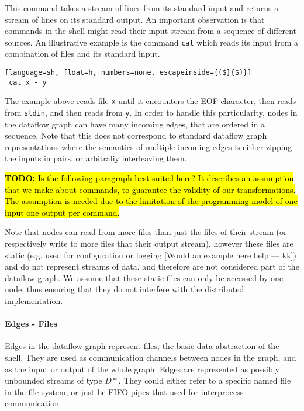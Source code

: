 \documentclass[sigplan,10pt,review,anonymous]{acmart}
\newcommand{\ttt}[1]{\texttt{\small #1}}
\newcommand{\TODO}[1]{\hl{\textbf{TODO:} #1}\xspace}
\newcommand{\kk}[1]{[{\color{magenta}#1 --- kk}]}
\begin{document}
\noindent
This command takes a stream of lines from its standard input and
returns a stream of lines on its standard output. An important
observation is that commands in the shell might read their input
stream from a sequence of different sources. An illustrative example
is the command \ttt{cat} which reads its input from a combination
of files and its standard input.

\begin{lstlisting}[language=sh, float=h, numbers=none, escapeinside={($}{$)}]
 cat x - y
\end{lstlisting}

The example above reads file \ttt{x} until it encounters the EOF
character, then reads from \ttt{stdin}, and then reads from
\ttt{y}. In order to handle this particularity, nodes in the
dataflow graph can have many incoming edges, that are ordered in a
sequence. Note that this does not correspond to standard dataflow
graph representations where the semantics of multiple incoming edges
is either zipping the inputs in pairs, or arbitraliy interleaving them.

\TODO{Is the following paragraph best suited here? It describes an
  assumption that we make about commands, to guarantee the validity of
  our transformations. The assumption is needed due to the limitation
  of the programming model of one input one output per command.}

Note that nodes can read from more files than just the files of their
stream (or respectively write to more files that their output stream),
however these files are static (e.g. used for configuration or logging
\kk{Would an example here help}) and do not represent streams of data,
and therefore are not considered part of the dataflow graph. We assume
that these static files can only be accessed by one node, thus
ensuring that they do not interfere with the distributed
implementation.

\paragraph{Edges - Files}

Edges in the dataflow graph represent files, the basic data
abstraction of the shell. They are used as communication channels
between nodes in the graph, and as the input or output of the whole
graph. Edges are represented as possibly unbounded streams of type
$D*$. They could either refer to a specific named file in the file
system, or just be FIFO pipes that used for interprocess communication
\end{document}
